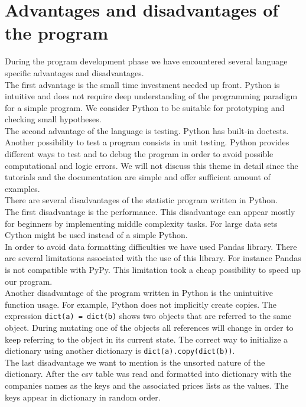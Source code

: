 \documentclass[
  twoside,
  11pt, a4paper,
  footinclude=true,
  headinclude=true,
  cleardoublepage=empty
]{scrreprt}
\begin{document}
    \section{Advantages and disadvantages of the program}
    During the program development phase we have encountered several language specific advantages and disadvantages.\\
    The first advantage is the small time investment needed up front. Python is intuitive and does not require deep understanding of the programming paradigm for a simple program. We consider Python to be suitable for prototyping and checking small hypotheses.\\
    The second advantage of the language is testing. Python has built-in doctests. Another possibility to test a program consists in unit testing. Python provides different ways to test and to debug the program in order to avoid possible computational and logic errors. We will not discuss this theme in detail since the tutorials and the documentation are simple and offer sufficient amount of examples.\\
    There are several disadvantages of the statistic program written in Python.\\ 
    The first disadvantage is the performance. This disadvantage can appear mostly for beginners by implementing middle complexity tasks. For large data sets Cython might be used instead of a simple Python.\\
    In order to avoid data formatting difficulties we have used Pandas library. There are several limitations associated with the use of this library. For instance Pandas is not compatible with PyPy. This limitation took a cheap possibility to speed up our program.\\
    Another disadvantage of the program written in Python is the unintuitive function usage. For example, Python does not implicitly create copies. The expression \texttt{dict(a) = dict(b)} shows two objects that are referred to the same object. During mutating one of the objects all references will change in order to keep referring to the object in its current state. The correct way to initialize a dictionary using another dictionary is \texttt{dict(a).copy(dict(b))}. \\
    The last disadvantage we want to mention is the unsorted nature of the dictionary. After the csv table was read and formatted into dictionary with the companies names as the keys and the associated prices lists as the values. The keys appear in dictionary in random order.
    
\end{document}
